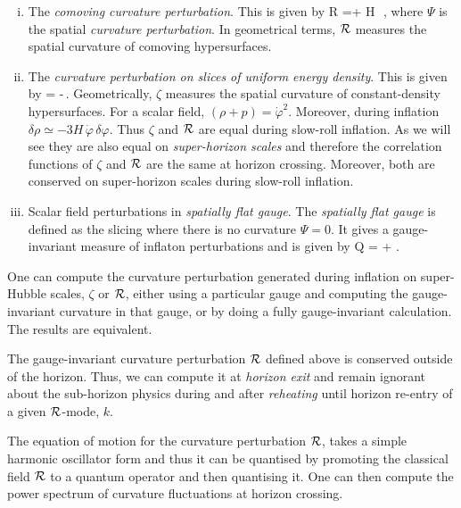 \begin{tcolorbox}[title={\bf Gauge invariant variables}]

\begin{enumerate}[i.]
\item The {\em comoving curvature perturbation}. This is given by
\be\label{eq:curvatureR}
{\cal R} =\Psi + H\, \frac{\delta\varphi}{\dot\varphi} \,,
\ee
where $\Psi$ is the spatial {\em curvature perturbation}. In geometrical terms, $\cal R$  measures the spatial curvature of comoving hypersurfaces.

\item The {\em curvature perturbation on slices of uniform energy density}. This is given by
\be
\zeta = \Psi -\,.
\ee
Geometrically, $\zeta$ measures the spatial curvature of constant-density hypersurfaces.
 For a scalar field, $(\rho+p) =\dot\varphi^2$. Moreover, during inflation   $\delta\rho \simeq-3H\,\dot\varphi\,\delta \varphi$.  Thus
 $\zeta$ and $\cal R$ are  equal during slow-roll inflation. As we will see they are also equal on {\em super-horizon scales} and therefore the correlation functions of $\zeta$ and $\cal R$ are  the same at horizon crossing. Moreover,  both  are conserved on super-horizon scales during slow-roll inflation.

\item Scalar field perturbations in  {\em spatially flat gauge}. The {\em spatially flat gauge} is defined as the slicing where there is no curvature $\Psi=0$. It gives a  gauge-invariant measure of inflaton perturbations and is given by
\be
Q = \delta\varphi +\,\Psi \,. 
\ee


\end{enumerate}

\end{tcolorbox}

\bigskip
One can compute the curvature perturbation generated during inflation on super-Hubble scales,  $\zeta$ or ${\cal R}$, either using a particular gauge and computing the gauge-invariant curvature in that gauge, or by doing a fully gauge-invariant calculation. The results are equivalent.

The gauge-invariant curvature perturbation $\cal R$ defined above   is conserved outside of the horizon. Thus, we can compute it   at {\em horizon exit} and remain ignorant about the sub-horizon physics during and after {\em reheating} until horizon re-entry of a given $\cal R$-mode, $k$.

The equation of motion for the curvature perturbation $\cal R$, takes a simple harmonic oscillator form  and thus it can be quantised by promoting the classical field $\cal R$ to a quantum operator and then quantising it. One can then compute the power spectrum of curvature fluctuations at horizon crossing.

